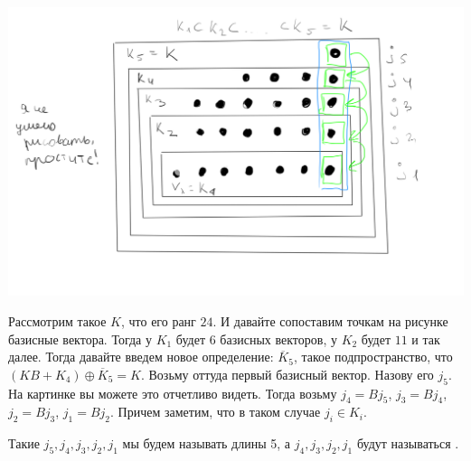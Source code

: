 \begin{center}
   \includegraphics[width = 15cm]{assets/7_9-zhordan-sample.png}
\end{center}

Рассмотрим такое $K$, что его ранг $24$. И давайте  сопоставим точкам на рисунке базисные вектора. Тогда у $K_1$ будет $6$ базисных векторов, у $K_2$ будет $11$ и так далее. Тогда давайте введем новое определение: $\overline{K}_5$, такое подпространство, что $(KB + K_4) \oplus \overline{K}_5 = K$. Возьму оттуда первый базисный вектор. Назову его $j_5$. На картинке вы можете это отчетливо видеть. Тогда возьму $j_4 =Bj_5$, $j_3 =Bj_4$, $j_2 =Bj_3$, $j_1 =Bj_2$. Причем заметим, что в таком случае $j_i \in K_i$.

Такие $j_5,j_4,j_3,j_2,j_1$ мы будем называть  длины 5, а $j_4,j_3,j_2,j_1$ будут называться .

